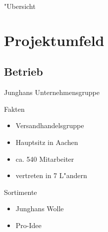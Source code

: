 \AtBeginSection{\frame{\sectionpage}}
\AtBeginSubsection{\frame{\subsectionpage}}

\date{\today}

\frenchspacing



\setcounter{framenumber}{0} 
\begin{frame}
  \maketitle
\end{frame}

\setcounter{figure}{0}

\begin{frame}{"Ubersicht}
  \tableofcontents
\end{frame}

\section{Projektumfeld}

\subsection{Betrieb}
\begin{frame}[<+->]{Junghans Unternehmensgruppe}
			\begin{block}{Fakten}
				\begin{itemize}[<+->]
						\item Versandhandelsgruppe
						\item Hauptsitz in Aachen
						\item ca. 540 Mitarbeiter
						\item vertreten in 7 L"andern
				\end{itemize}
			\end{block}

			\begin{block}{Sortimente}
				\begin{itemize}[<+->]
						\item Junghans Wolle
						\item Pro-Idee
				\end{itemize}
			\end{block}
\end{frame}

